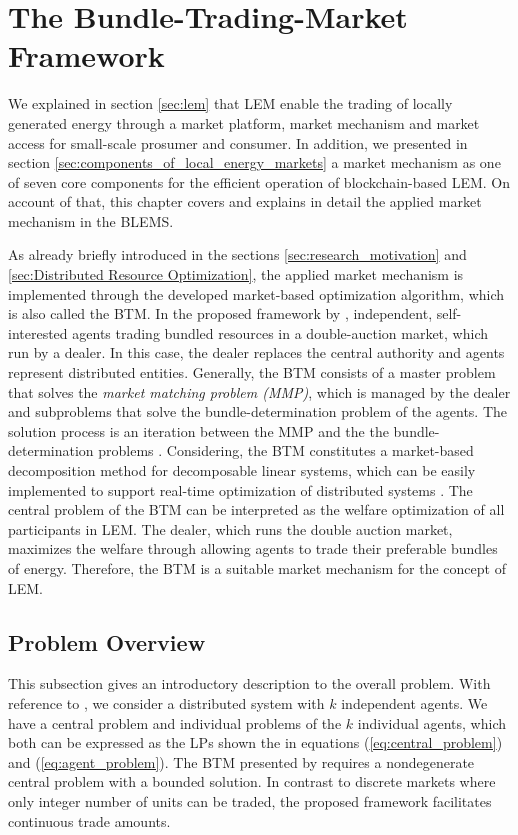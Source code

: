 \section{The Bundle-Trading-Market Framework}
\label{sec:btm}
We explained in section \ref{sec:lem} that LEM enable the trading 
of locally generated energy through a market platform, market mechanism and market access for 
small-scale prosumer and consumer. 
In addition, we presented in section \ref{sec:components_of_local_energy_markets} 
a market mechanism as one of seven core components for the efficient operation of blockchain-based
LEM. On account of that, this chapter covers and explains in detail the applied market mechanism in the BLEMS. 

As already briefly introduced in the sections \ref{sec:research_motivation} 
and \ref{sec:Distributed Resource Optimization}, the applied market mechanism is implemented 
through the developed market-based optimization algorithm, which is also called the 
BTM. 
In the proposed framework by , independent, self-interested
agents trading bundled resources in a double-auction market, which run by a dealer. 
In this case, the dealer replaces the central authority and agents represent distributed
entities. Generally, the BTM consists of a master problem that solves the \textit{market matching problem (MMP)}, which is managed by the dealer
and subproblems that solve the bundle-determination problem of the agents.
The solution process is an iteration between the MMP and the 
the bundle-determination problems .
Considering, the BTM constitutes a market-based decomposition method 
for decomposable linear systems,
which can be easily implemented to support real-time optimization 
of distributed systems .
The central problem of the BTM can be interpreted as the welfare optimization of all participants in LEM. 
The dealer, which runs the double auction market, maximizes the welfare through allowing 
agents to trade their preferable bundles of energy.
Therefore, the BTM is a suitable market mechanism for the concept of LEM.

\subsection{Problem Overview}
\label{sec:btm_problem_overview}
This subsection gives an introductory description to the overall problem. 
With reference to , we consider a distributed 
system with $k$ independent agents.
We have a central problem and individual problems of the $k$ individual agents, which both can be expressed as the 
LPs shown the in equations (\ref{eq:central_problem}) and (\ref{eq:agent_problem}). 
The BTM presented by  requires 
a nondegenerate central problem with a bounded solution. In contrast to discrete markets where 
only integer number of units can be traded, the proposed framework facilitates continuous trade amounts. 

